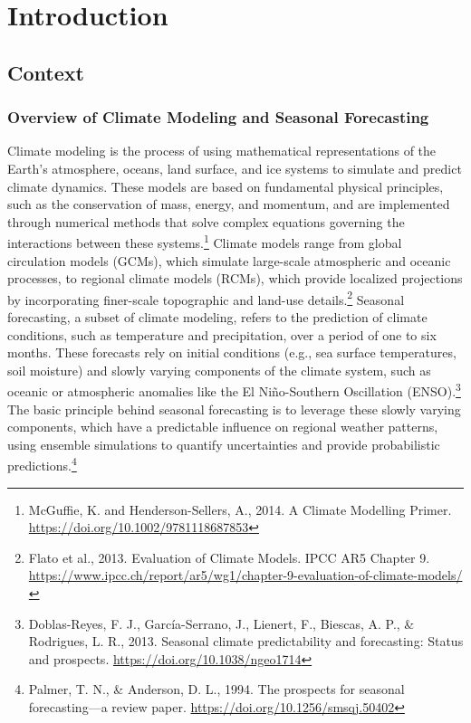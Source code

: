 \chapter{Introduction}
\section{Context}
\subsection{Overview of Climate Modeling and Seasonal Forecasting}

Climate modeling is the process of using mathematical representations of the Earth’s atmosphere, oceans, land surface, and ice systems to simulate and predict climate dynamics. These models are based on fundamental physical principles, such as the conservation of mass, energy, and momentum, and are implemented through numerical methods that solve complex equations governing the interactions between these systems.\footnote{McGuffie, K. and Henderson-Sellers, A., 2014. A Climate Modelling Primer. \url{https://doi.org/10.1002/9781118687853}} Climate models range from global circulation models (GCMs), which simulate large-scale atmospheric and oceanic processes, to regional climate models (RCMs), which provide localized projections by incorporating finer-scale topographic and land-use details.\footnote{Flato et al., 2013. Evaluation of Climate Models. IPCC AR5 Chapter 9. \url{https://www.ipcc.ch/report/ar5/wg1/chapter-9-evaluation-of-climate-models/}} Seasonal forecasting, a subset of climate modeling, refers to the prediction of climate conditions, such as temperature and precipitation, over a period of one to six months. These forecasts rely on initial conditions (e.g., sea surface temperatures, soil moisture) and slowly varying components of the climate system, such as oceanic or atmospheric anomalies like the El Niño-Southern Oscillation (ENSO).\footnote{Doblas-Reyes, F. J., García-Serrano, J., Lienert, F., Biescas, A. P., \& Rodrigues, L. R., 2013. Seasonal climate predictability and forecasting: Status and prospects. \url{https://doi.org/10.1038/ngeo1714}} The basic principle behind seasonal forecasting is to leverage these slowly varying components, which have a predictable influence on regional weather patterns, using ensemble simulations to quantify uncertainties and provide probabilistic predictions.\footnote{Palmer, T. N., \& Anderson, D. L., 1994. The prospects for seasonal forecasting—a review paper. \url{https://doi.org/10.1256/smsqj.50402}}  


